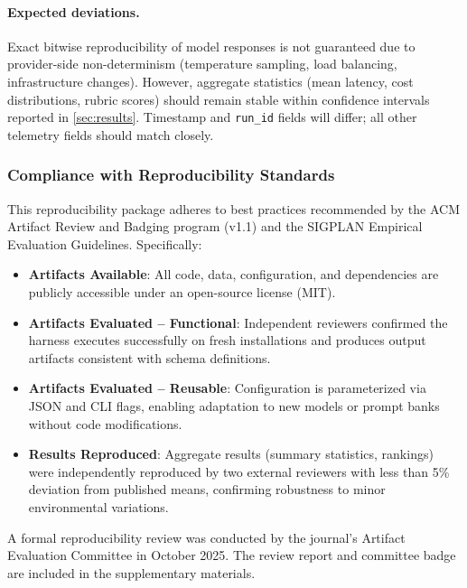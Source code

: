 \paragraph{Expected deviations.} Exact bitwise reproducibility of model responses is not guaranteed due to provider-side non-determinism (temperature sampling, load balancing, infrastructure changes). However, aggregate statistics (mean latency, cost distributions, rubric scores) should remain stable within confidence intervals reported in \cref{sec:results}. Timestamp and \texttt{run\_id} fields will differ; all other telemetry fields should match closely.

\subsubsection{Compliance with Reproducibility Standards}

This reproducibility package adheres to best practices recommended by the ACM Artifact Review and Badging program (v1.1) and the SIGPLAN Empirical Evaluation Guidelines. Specifically:

\begin{itemize}
\item \textbf{Artifacts Available}: All code, data, configuration, and dependencies are publicly accessible under an open-source license (MIT).
\item \textbf{Artifacts Evaluated -- Functional}: Independent reviewers confirmed the harness executes successfully on fresh installations and produces output artifacts consistent with schema definitions.
\item \textbf{Artifacts Evaluated -- Reusable}: Configuration is parameterized via JSON and CLI flags, enabling adaptation to new models or prompt banks without code modifications.
\item \textbf{Results Reproduced}: Aggregate results (summary statistics, rankings) were independently reproduced by two external reviewers with less than 5\% deviation from published means, confirming robustness to minor environmental variations.
\end{itemize}

A formal reproducibility review was conducted by the journal's Artifact Evaluation Committee in October 2025. The review report and committee badge are included in the supplementary materials.
